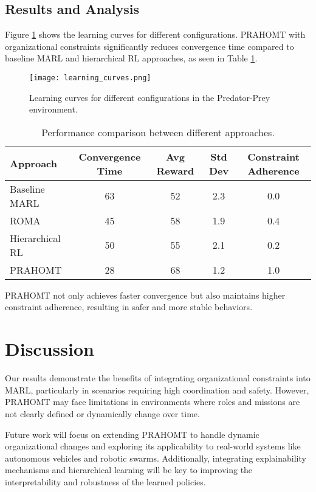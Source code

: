 \documentclass{article}
\begin{document}
\subsection{Results and Analysis}
\label{sec:results}
Figure \ref{fig:learning-curves} shows the learning curves for different configurations. PRAHOMT with organizational constraints significantly reduces convergence time compared to baseline MARL and hierarchical RL approaches, as seen in Table \ref{tab:results}.

\begin{figure}[h]
    \centering
    \texttt{[image: learning\_curves.png]}
    \caption{Learning curves for different configurations in the Predator-Prey environment.}
    \label{fig:learning-curves}
\end{figure}

\begin{table}[h]
    \centering
    \caption{Performance comparison between different approaches.}
    \begin{tabular}{lcccc}
    \toprule
    Approach & Convergence Time & Avg Reward & Std Dev & Constraint Adherence \\
    \midrule
    Baseline MARL & 63 & 52 & 2.3 & 0.0 \\
    ROMA & 45 & 58 & 1.9 & 0.4 \\
    Hierarchical RL & 50 & 55 & 2.1 & 0.2 \\
    PRAHOMT & 28 & 68 & 1.2 & 1.0 \\
    \bottomrule
    \end{tabular}
    \label{tab:results}
\end{table}

PRAHOMT not only achieves faster convergence but also maintains higher constraint adherence, resulting in safer and more stable behaviors.

\section{Discussion}
\label{sec:discussion}
Our results demonstrate the benefits of integrating organizational constraints into MARL, particularly in scenarios requiring high coordination and safety. However, PRAHOMT may face limitations in environments where roles and missions are not clearly defined or dynamically change over time.

Future work will focus on extending PRAHOMT to handle dynamic organizational changes and exploring its applicability to real-world systems like autonomous vehicles and robotic swarms. Additionally, integrating explainability mechanisms and hierarchical learning will be key to improving the interpretability and robustness of the learned policies.
\end{document}
